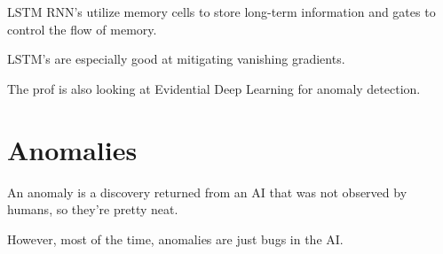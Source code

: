 \documentclass[fleqn]{report}
\begin{document}
LSTM RNN's utilize memory cells to store long-term information 
and gates to control the flow of memory. 

LSTM's are especially good at mitigating vanishing gradients. 

The prof is also looking at Evidential Deep Learning for anomaly detection. 
\section{Anomalies}


An anomaly is a discovery returned from an AI that was not 
observed by humans, so they're pretty neat. 

However, most of the time, anomalies are just bugs in the AI. 
\end{document}
